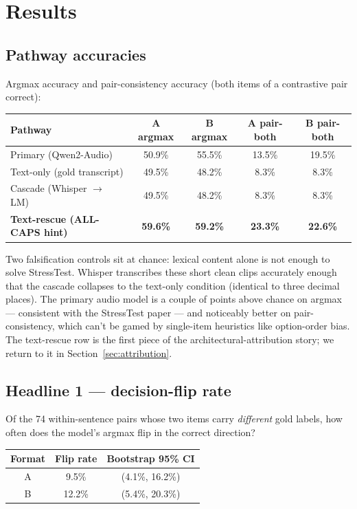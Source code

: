 \documentclass[11pt]{article}
\begin{document}
\section{Results}

\subsection{Pathway accuracies}

Argmax accuracy and pair-consistency accuracy (both items of a
contrastive pair correct):

\begin{center}
\small
\begin{tabular}{l c c c c}
\toprule
\textbf{Pathway} & \textbf{A argmax} & \textbf{B argmax} & \textbf{A pair-both} & \textbf{B pair-both} \\
\midrule
Primary (Qwen2-Audio) & 50.9\% & 55.5\% & 13.5\% & 19.5\% \\
Text-only (gold transcript) & 49.5\% & 48.2\% & 8.3\% & 8.3\% \\
Cascade (Whisper $\rightarrow$ LM) & 49.5\% & 48.2\% & 8.3\% & 8.3\% \\
\textbf{Text-rescue (ALL-CAPS hint)} & \textbf{59.6\%} & \textbf{59.2\%} & \textbf{23.3\%} & \textbf{22.6\%} \\
\bottomrule
\end{tabular}
\end{center}

Two falsification controls sit at chance: lexical content alone is
not enough to solve StressTest. Whisper transcribes these short
clean clips accurately enough that the cascade collapses to the
text-only condition (identical to three decimal places). The
primary audio model is a couple of points above chance on argmax
--- consistent with the StressTest paper --- and noticeably better
on pair-consistency, which can't be gamed by single-item heuristics
like option-order bias. The text-rescue row is the first piece of
the architectural-attribution story; we return to it in
Section~\ref{sec:attribution}.

\subsection{Headline 1 --- decision-flip rate}

Of the 74 within-sentence pairs whose two items carry
\emph{different} gold labels, how often does the model's argmax
flip in the correct direction?

\begin{center}
\small
\begin{tabular}{c c c}
\toprule
\textbf{Format} & \textbf{Flip rate} & \textbf{Bootstrap 95\% CI} \\
\midrule
A & 9.5\% & (4.1\%, 16.2\%) \\
B & 12.2\% & (5.4\%, 20.3\%) \\
\bottomrule
\end{tabular}
\end{center}
\end{document}
